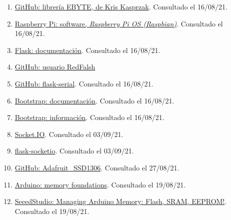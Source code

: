 \documentclass[12pt]{article}
\begin{document}
\begin{enumerate}
			\item 
			\label{bib: github libreria EBYTE}
			\href{https://github.com/KrisKasprzak/EBYTE}{GitHub: librería EBYTE, de Kris Kasprzak}. Consultado el 16/08/21.
			
			\item 
			\label{bib: raspbian}
			\href{https://www.raspberrypi.org/software/}{Raspberry Pi: software, \textit{Raspberry Pi OS (Raspbian)}}. Consultado el 16/08/21.
			
			\item 
			\label{bib: flask doc}
			\href{https://flask.palletsprojects.com/en/2.0.x/}{Flask: documentación}. Consultado el 16/08/21.
			
			\item
			\label{red falsh}
			\href{https://github.com/RedFalsh}{GitHub: usuario RedFalsh}
						
			\item 
			\label{bib: flask serial}
			\href{https://github.com/RedFalsh/flask-serial/blob/master/README.md}{GitHub: flask-serial}. Consultado el 16/08/21.
			
			\item 
			\label{bib: bootstrap doc}
			\href{https://getbootstrap.com/docs/5.0/getting-started/introduction/}{Bootstrap: documentación}. Consultado el 16/08/21.
			
			\item 
			\label{bib: bootstrap info}
			\href{https://rockcontent.com/es/blog/bootstrap/}{Bootstrap: información}. Consultado el 16/08/21.
			
			\item
			\label{socketio}
			\href{https://socket.io/}{Socket.IO}. Consultado el 03/09/21.

			\item
			\label{flask socketio}
			\href{https://flask-socketio.readthedocs.io/en/latest/}{flask-socketio}. Consultado el 03/09/21.

			\item
			\label{adafruit library}
			\href{https://github.com/adafruit/Adafruit_SSD1306}{GitHub: Adafruit\_SSD1306}. Consultado el 27/08/21.

			\item 
			\label{bib: arduino memory foundations}
			\href{https://www.arduino.cc/en/Tutorial/Foundations/Memory}{Arduino: memory foundations}. Consultado el 19/08/21.

			\item 
			\label{bib: seeedstudio arduino memory}
			\href{https://www.seeedstudio.com/blog/2021/04/26/managing-arduino-memory-flash-sram-eeprom/}{SeeedStudio: Managing Arduino Memory: Flash, SRAM, EEPROM!}. Consultado el 19/08/21.	
			

\end{enumerate}
\end{document}

